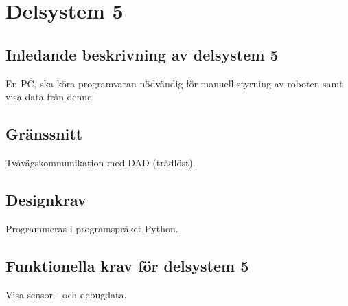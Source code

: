 \section{Delsystem 5}

\subsection{Inledande beskrivning av delsystem 5}
En PC, ska köra programvaran nödvändig för manuell styrning av roboten samt visa data från denne. 

\subsection{Gränssnitt}
Tvåvägskommunikation med DAD (trådlöst).

\subsection{Designkrav}
Programmeras i programspråket Python.

\subsection{Funktionella krav för delsystem 5}
Visa sensor - och debugdata.
